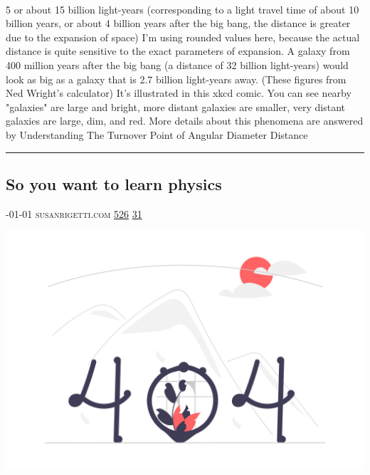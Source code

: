 \documentclass[10pt,a4paper]{article}
\begin{document}
\begin{multicols*}{2}
\paragraph{}
5 or about 15 billion light-years (corresponding to a light travel time of about 10 billion years, or about 4 billion years after the big bang, the distance is greater due to the expansion of space) I'm using rounded values here, because the actual distance is quite sensitive to the exact parameters of expansion.
A galaxy from 400 million years after the big bang (a distance of 32 billion light-years) would look as big as a galaxy that is 2.7 billion light-years away. (These figures from Ned Wright's calculator)
It's illustrated in this xkcd comic. You can see nearby "galaxies" are large and bright, more distant galaxies are smaller, very distant galaxies are large, dim, and red. More details about this phenomena are answered by Understanding The Turnover Point of Angular Diameter Distance
\par\noindent\textcolor{red}{\rule{\linewidth}{0.2mm}}
\vfill
\null
\noindent\begin{minipage}{\linewidth}
\subsection{So you want to learn physics}
\textsc{\footnotesize
{\scriptsize\faCalendar}-01-01 
{\scriptsize\faGlobe}\space 
susanrigetti.com 
{\scriptsize\faThumbsOUp}\space 
\href{http://news.ycombinator.com/item?id=37200615\&utm\_term=comment}{526} 
{\scriptsize\faComments}\space 
\href{http://news.ycombinator.com/item?id=37200615\&utm\_term=comment}{31} 
}
\par\medskip\noindent
\href{https://www.susanrigetti.com/physics?utm\_source=hackernewsletter\&utm\_medium=email\&utm\_term=learn}{
    \includegraphics[width=0.99\linewidth]{notfound.png}
}
\end{minipage}

\end{multicols*}
\end{document}
